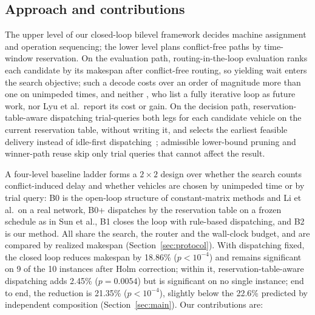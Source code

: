 \documentclass[preprint,review,12pt,authoryear]{elsarticle}
\newcommand{\NCases}{10}
\newcommand{\GainLoopRule}{18.86\%}      %
\newcommand{\PLoopRule}{<10^{-4}}
\newcommand{\GainProbeLoop}{2.45\%}      %
\newcommand{\PProbeLoop}{=0.0054}
\newcommand{\GainEndToEnd}{21.35\%}      %
\newcommand{\PEndToEnd}{<10^{-4}}
\newcommand{\GainIndepProduct}{22.6\%}
\newcommand{\CellsSigLoopAdj}{9}
\begin{document}
\subsection{Approach and contributions}

The upper level of our closed-loop bilevel framework decides machine assignment and operation sequencing; the lower level plans conflict-free paths by time-window reservation.
On the evaluation path, routing-in-the-loop evaluation ranks each candidate by its makespan after conflict-free routing, so yielding wait enters the search objective; such a decode costs over an order of magnitude more than one on unimpeded times, and neither \citet{li2026framework}, who list a fully iterative loop as future work, nor Lyu et al.\ report its cost or gain.
On the decision path, reservation-table-aware dispatching trial-queries both legs for each candidate vehicle on the current reservation table, without writing it, and selects the earliest feasible delivery instead of idle-first dispatching~\citep{lu2022agv}; admissible lower-bound pruning and winner-path reuse skip only trial queries that cannot affect the result.

A four-level baseline ladder forms a $2\times2$ design over whether the search counts conflict-induced delay and whether vehicles are chosen by unimpeded time or by trial query: B0 is the open-loop structure of constant-matrix methods and Li et al.\ on a real network, B0+ dispatches by the reservation table on a frozen schedule as in Sun et al., B1 closes the loop with rule-based dispatching, and B2 is our method.
All share the search, the router and the wall-clock budget, and are compared by realized makespan (Section~\ref{sec:protocol}).
With dispatching fixed, the closed loop reduces makespan by \GainLoopRule{} ($p\PLoopRule$) and remains significant on \CellsSigLoopAdj{} of the \NCases{} instances after Holm correction; within it, reservation-table-aware dispatching adds \GainProbeLoop{} ($p\PProbeLoop$) but is significant on no single instance; end to end, the reduction is \GainEndToEnd{} ($p\PEndToEnd$), slightly below the \GainIndepProduct{} predicted by independent composition (Section~\ref{sec:main}).
Our contributions are:
\end{document}
